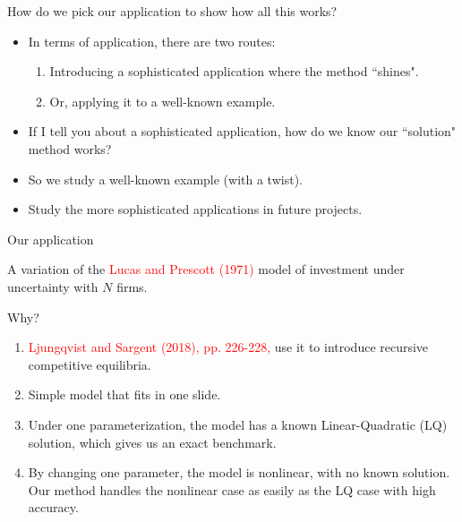 \documentclass[aspectratio=169,10pt]{beamer}
\begin{document}
		\begin{frame}{How do we pick our application to show how all this works?}
			\begin{itemize}
				\item In terms of application, there are two routes:\vspace{0.1in}
				\begin{enumerate}
					\item Introducing a sophisticated application where the method ``shines".\vspace{0.1in}
					\item Or, applying it to a well-known example.\vspace{0.1in} 
				\end{enumerate}
			\item If I tell you about a sophisticated application, how do we know our ``solution" method works?\vspace{0.1in}
			\item So we study a well-known example (with a twist).\vspace{0.1in}
			\item Study the more sophisticated applications in future projects.
			
			\end{itemize}
		\end{frame}
		
		\begin{frame}{Our application}
		
			A variation of the \textcolor{red}{Lucas and Prescott (1971)} model of investment under uncertainty with $N$ firms.\vspace{0.1in}
		
			Why?\vspace{0.1in}
		
			\begin{enumerate}
		
				\item \textcolor{red}{Ljungqvist and Sargent (2018), pp. 226-228,} use it to introduce recursive competitive equilibria.\vspace{0.1in}
		
				\item Simple model that fits in one slide.\vspace{0.1in}
		
				\item Under one parameterization, the model has a known Linear-Quadratic (LQ) solution, which gives us an exact benchmark.\vspace{0.1in}
		
				\item By changing one parameter, the model is nonlinear, with no known solution. Our method handles the nonlinear case as easily as the LQ case  with high accuracy.
		
			\end{enumerate}
		\end{frame}
	
\end{document}
